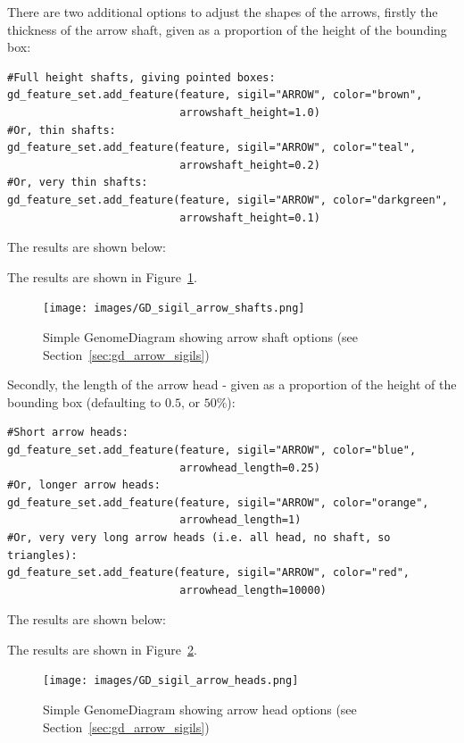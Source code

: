 \documentclass{report}
\begin{document}
There are two additional options to adjust the shapes of the arrows, firstly
the thickness of the arrow shaft, given as a proportion of the height of the
bounding box:

\begin{verbatim}
#Full height shafts, giving pointed boxes:
gd_feature_set.add_feature(feature, sigil="ARROW", color="brown",
                           arrowshaft_height=1.0)
#Or, thin shafts:                      
gd_feature_set.add_feature(feature, sigil="ARROW", color="teal",
                           arrowshaft_height=0.2)
#Or, very thin shafts:
gd_feature_set.add_feature(feature, sigil="ARROW", color="darkgreen",
                           arrowshaft_height=0.1)
\end{verbatim}

\begin{htmlonly}
\noindent The results are shown below:


\end{htmlonly}
\begin{latexonly}
\noindent The results are shown in Figure~\ref{fig:gd_sigil_arrow_shafts}.
\begin{figure}[htbp]
\centering
\texttt{[image: images/GD\_sigil\_arrow\_shafts.png]}
\caption{Simple GenomeDiagram showing arrow shaft options
(see Section~\ref{sec:gd_arrow_sigils})}
\label{fig:gd_sigil_arrow_shafts}
\end{figure}
\end{latexonly}

Secondly, the length of the arrow head - given as a proportion of the height
of the bounding box (defaulting to $0.5$, or $50\%$):

\begin{verbatim}
#Short arrow heads:
gd_feature_set.add_feature(feature, sigil="ARROW", color="blue",
                           arrowhead_length=0.25)
#Or, longer arrow heads:
gd_feature_set.add_feature(feature, sigil="ARROW", color="orange",
                           arrowhead_length=1)
#Or, very very long arrow heads (i.e. all head, no shaft, so triangles):
gd_feature_set.add_feature(feature, sigil="ARROW", color="red",
                           arrowhead_length=10000)
\end{verbatim}

\begin{htmlonly}
\noindent The results are shown below:


\end{htmlonly}
\begin{latexonly}
\noindent The results are shown in Figure~\ref{fig:gd_sigil_arrow_heads}.
\begin{figure}[htbp]
\centering
\texttt{[image: images/GD\_sigil\_arrow\_heads.png]}
\caption{Simple GenomeDiagram showing arrow head options
(see Section~\ref{sec:gd_arrow_sigils})}
\label{fig:gd_sigil_arrow_heads}
\end{figure}
\end{latexonly}
\end{document}
